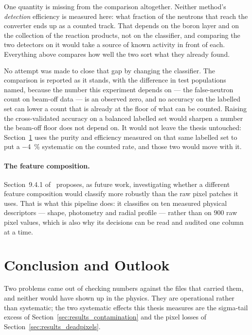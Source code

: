 \documentclass[a4paper,headsepline,oneside,11pt]{scrartcl}
\begin{document}
One quantity is missing from the comparison altogether. Neither method's
\emph{detection} efficiency is measured here: what fraction of the neutrons that
reach the converter ends up as a counted track. That depends on the boron layer
and on the collection of the reaction products, not on the classifier, and
comparing the two detectors on it would take a source of known activity in front
of each. Everything above compares how well the two sort what they already found.

No attempt was made to close that gap by changing the classifier. The comparison
is reported as it stands, with the difference in test populations named, because
the number this experiment depends on --- the false-neutron count on beam-off
data --- is an observed zero, and no accuracy on the labelled set can lower a
count that is already at the floor of what can be counted. Raising the cross-validated accuracy on a balanced
labelled set would sharpen a number the beam-off floor does not depend on. It
would not leave the thesis untouched: Section~\ref{sec:conclusion} uses the
purity and efficiency measured on that same labelled set to put a \SI{-4}{\percent}
systematic on the counted rate, and those two would move with it.

\paragraph{The feature composition.} Section~9.4.1
of~\cite{Filter2018} proposes, as future work, investigating whether a different
feature composition would classify more robustly than the raw  pixel
patches it uses. That is what this pipeline does: it classifies on ten measured
physical descriptors --- shape, photometry and radial profile --- rather than on
$900$ raw pixel values, which is also why its decisions can be read and audited
one column at a time.

\FloatBarrier
\newpage
\section{Conclusion and Outlook}
\label{sec:conclusion}

Two problems came out of checking numbers against the files that carried them,
and neither would have shown up in the physics. They are operational rather than
systematic; the two systematic effects this thesis measures are the
sigma-tail excess of Section~\ref{sec:results_contamination} and the pixel
losses of Section~\ref{sec:results_deadpixels}.
\end{document}
